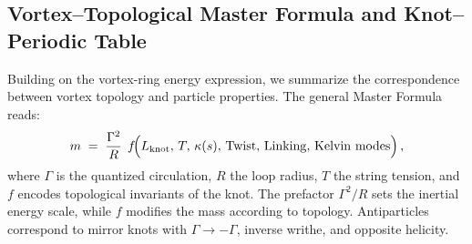 \documentclass[12pt]{article}
\begin{document}
{{\subsection{Vortex--Topological Master Formula and Knot--Periodic Table}

Building on the vortex-ring energy expression, we summarize the correspondence between vortex topology and particle properties. The general Master Formula reads:
\begin{equation}
m \;=\; \frac{\Gamma^2}{R}\;\,f\!\Big(L_{\rm knot},\,T,\,\kappa(s),\,\mathrm{Twist},\,\mathrm{Linking},\,\mathrm{Kelvin~modes}\Big)\,,
\label{eq:master}
\end{equation}
where $\Gamma$ is the quantized circulation, $R$ the loop radius, $T$ the string tension, and $f$ encodes topological invariants of the knot. The prefactor $\Gamma^2/R$ sets the inertial energy scale, while $f$ modifies the mass according to topology. Antiparticles correspond to mirror knots with $\Gamma \to -\Gamma$, inverse writhe, and opposite helicity.

}}
\end{document}
